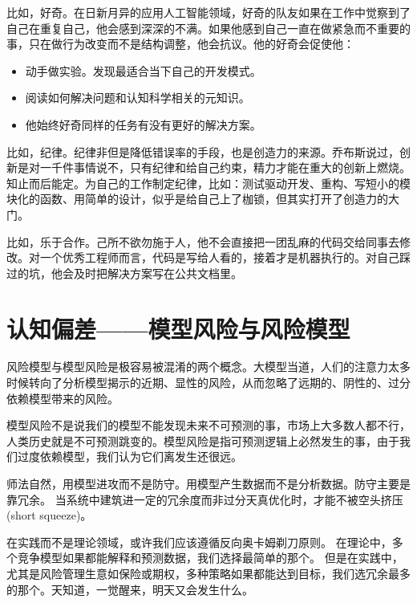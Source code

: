 \documentclass[
  oneside]{book}
\providecommand{\tightlist}{%
  \setlength{\itemsep}{0pt}\setlength{\parskip}{0pt}}
\begin{document}
比如，好奇。在日新月异的应用人工智能领域，好奇的队友如果在工作中觉察到了自己在重复自己，他会感到深深的不满。如果他感到自己一直在做紧急而不重要的事，只在做行为改变而不是结构调整，他会抗议。他的好奇会促使他：

\begin{itemize}
\tightlist
\item
  动手做实验。发现最适合当下自己的开发模式。
\item
  阅读如何解决问题和认知科学相关的元知识。
\item
  他始终好奇同样的任务有没有更好的解决方案。
\end{itemize}

比如，纪律。纪律非但是降低错误率的手段，也是创造力的来源。乔布斯说过，创新是对一千件事情说不，只有纪律和给自己约束，精力才能在重大的创新上燃烧。
知止而后能定。为自己的工作制定纪律，比如：测试驱动开发、重构、写短小的模块化的函数、用简单的设计，似乎是给自己上了枷锁，但其实打开了创造力的大门。

比如，乐于合作。己所不欲勿施于人，他不会直接把一团乱麻的代码交给同事去修改。对一个优秀工程师而言，代码是写给人看的，接着才是机器执行的。对自己踩过的坑，他会及时把解决方案写在公共文档里。

\hypertarget{ux8ba4ux77e5ux504fux5deeux6a21ux578bux98ceux9669ux4e0eux98ceux9669ux6a21ux578b}{%
\chapter{认知偏差------模型风险与风险模型}\label{ux8ba4ux77e5ux504fux5deeux6a21ux578bux98ceux9669ux4e0eux98ceux9669ux6a21ux578b}}

风险模型与模型风险是极容易被混淆的两个概念。大模型当道，人们的注意力太多时候转向了分析模型揭示的近期、显性的风险，从而忽略了远期的、阴性的、过分依赖模型带来的风险。

模型风险不是说我们的模型不能发现未来不可预测的事，市场上大多数人都不行，人类历史就是不可预测跳变的。模型风险是指可预测逻辑上必然发生的事，由于我们过度依赖模型，我们认为它们离发生还很远。

师法自然，用模型进攻而不是防守。用模型产生数据而不是分析数据。防守主要是靠冗余。
当系统中建筑进一定的冗余度而非过分天真优化时，才能不被空头挤压(short squeeze)。

在实践而不是理论领域，或许我们应该遵循反向奥卡姆剃刀原则。
在理论中，多个竞争模型如果都能解释和预测数据，我们选择最简单的那个。
但是在实践中，尤其是风险管理生意如保险或期权，多种策略如果都能达到目标，我们选冗余最多的那个。天知道，一觉醒来，明天又会发生什么。
\end{document}
